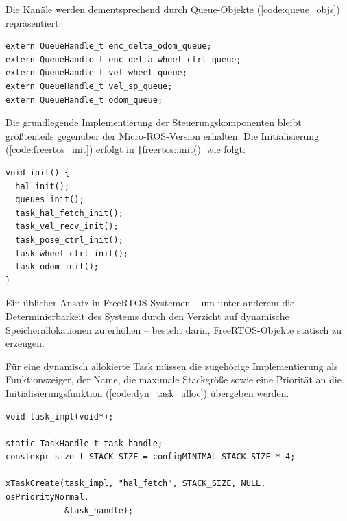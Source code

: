 Die Kanäle werden dementsprechend durch Queue-Objekte (\ref{code:queue_objs})
repräsentiert:

\begin{code}
\begin{verbatim}
extern QueueHandle_t enc_delta_odom_queue;
extern QueueHandle_t enc_delta_wheel_ctrl_queue;
extern QueueHandle_t vel_wheel_queue;
extern QueueHandle_t vel_sp_queue;
extern QueueHandle_t odom_queue;
\end{verbatim}
    \label{code:queue_objs}
\end{code}

Die grundlegende Implementierung der Steuerungskomponenten bleibt größtenteils
gegenüber der Micro-ROS-Version erhalten. Die Initialisierung
(\ref{code:freertos_init}) erfolgt in \texttt|freertos::init()| wie
folgt:

\begin{code}
\begin{verbatim}
void init() {
  hal_init();
  queues_init();
  task_hal_fetch_init();
  task_vel_recv_init();
  task_pose_ctrl_init();
  task_wheel_ctrl_init();
  task_odom_init();
}
\end{verbatim}
    \label{code:freertos_init}
\end{code}

Ein üblicher Ansatz in FreeRTOS-Systemen -- um unter anderem die
Determinierbarkeit des Systems durch den Verzicht auf dynamische
Speicherallokationen zu erhöhen \cite{freertos_memory_management} -- besteht
darin, FreeRTOS-Objekte statisch zu erzeugen.

Für eine dynamisch allokierte Task müssen die zugehörige Implementierung als
Funktionszeiger, der Name, die maximale Stackgröße sowie eine Priorität an die
Initialisierungsfunktion (\ref{code:dyn_task_alloc}) übergeben werden.

\begin{code}
\begin{verbatim}
void task_impl(void*);

static TaskHandle_t task_handle;
constexpr size_t STACK_SIZE = configMINIMAL_STACK_SIZE * 4;

xTaskCreate(task_impl, "hal_fetch", STACK_SIZE, NULL, osPriorityNormal,
            &task_handle);
\end{verbatim}
    \label{code:dyn_task_alloc}
\end{code}

